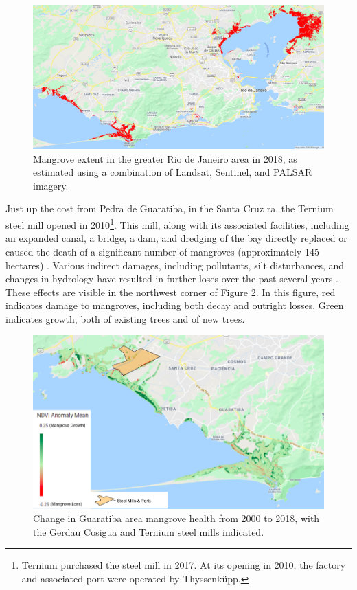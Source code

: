 \begin{figure}[h]
	\centering
	\includegraphics[scale=0.25]{Figures/chap4/MangroveExtent.png}
	\caption[Mangrove extent in the greater Rio de Janeiro area in 2018]{Mangrove extent in the greater Rio de Janeiro area in 2018, as estimated using a combination of Landsat, Sentinel, and PALSAR imagery.}
	\label{fig:mangrove-extent}
\end{figure}

Just up the cost from Pedra de Guaratiba, in the Santa Cruz \ac{ra}, the Ternium steel mill opened in 2010\footnote{Ternium purchased the steel mill in 2017. At its opening in 2010, the factory and associated port were operated by Thyssenküpp.}. This mill, along with its associated facilities, including an expanded canal, a bridge, a dam, and dredging of the bay directly replaced or caused the death of a significant number of mangroves (approximately 145 hectares) \cite{ecologusESTUDOIMPACTOAMBIENTALE2005}. Various indirect damages, including pollutants, silt disturbances, and changes in hydrology have resulted in further loses over the past several years \cite{lopesTerritorialidadesEmConflitos2013}. These effects are visible in the northwest corner of Figure \ref{fig:mangrove-ndvi-anomaly}. In this figure, red indicates damage to mangroves, including both decay and outright losses. Green indicates growth, both of existing trees and of new trees.

\begin{figure}[h]
	\centering
	\includegraphics[scale=0.4]{Figures/chap4/NDVIanomaly_v2.png}
	\caption[Change in Guaratiba area mangrove health from 2000 to 2018]{Change in Guaratiba area mangrove health from 2000 to 2018, with the Gerdau Cosigua and Ternium steel mills indicated.}
	\label{fig:mangrove-ndvi-anomaly}
\end{figure}

